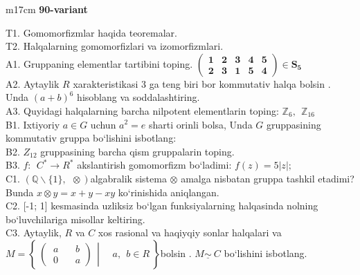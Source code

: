 \documentclass{article}
\begin{document}
\begin{tabular}{m{17cm}}
\textbf{90-variant}
\newline

T1. Gomomorfizmlar haqida teoremalar. \\
T2. Halqalarning gomomorfizlari va izomorfizmlari. \\
A1. Gruppaning elementlar tartibini toping. \(\begin{pmatrix}
\mathbf{1} & \mathbf{2} & \mathbf{3} & \mathbf{4} & \mathbf{5} \\
\mathbf{2} & \mathbf{3} & \mathbf{1} & \mathbf{5} & \mathbf{4}
\end{pmatrix}\mathbf{\in}\mathbf{S}_{\mathbf{5}}\) \\
A2. Aytaylik \(R\) xarakteristikasi 3 ga teng biri bor kommutativ halqa bo\textquotesingle lsin . Unda \((a + b)^{6}\) hisoblang va soddalashtiring. \\
A3. Quyidagi halqalarning barcha nilpotent elementlarin toping: \(\mathbb{Z}_{6},\ \ \mathbb{Z}_{16}\) \\
B1. Ixtiyoriy \(a \in G\) uchun \(a^{2} = e\) sharti orinli bolsa, Unda \(G\) gruppasining kommutativ gruppa bo`lishini isbotlang: \\
B2. \(Z_{12}\) gruppasining barcha qism gruppalarin toping. \\
B3. \(f:\ \ C^{*} \rightarrow R^{*}\) akslantirish gomomorfizm bo`ladimi: \(f(z) = 5|z|;\) \\
C1. \(\left( \mathbb{Q}\backslash\{ 1\},\ \  \otimes \right)\)algabralik sistema \(\otimes\) amalga nisbatan gruppa tashkil etadimi? Bunda \(x \otimes y = x + y - xy\) ko`rinishida aniqlangan. \\
C2. {[}-1; 1{]} kesmasinda uzliksiz bo`lgan funksiyalarning halqasinda nolning bo`luvchilariga misollar keltiring. \\
C3. Aytaylik, \(R\) va \(C\) xos rasional va haqiyqiy sonlar halqalari va\(M = \left\{ \left. \ \begin{pmatrix}
\ a\ \ \ \ \ \ \ \ b \\
\ 0\ \ \ \ \ \ \ \ a
\end{pmatrix}\ \  \right|\ \ \ \ \ \ a,\ \ b \in R\  \right\}\)bo\textquotesingle lsin . \(M\underline{\sim}\ C\) bo`lishini isbotlang. \\

\end{tabular}
\vspace{1cm}
\end{document}
